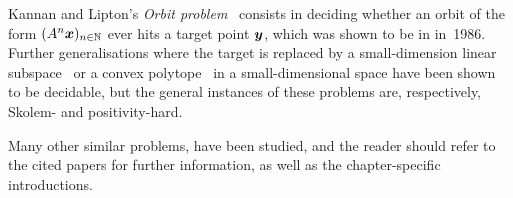 Kannan and Lipton's \emph{Orbit problem}~\cite{KL86} consists in deciding whether an orbit of the form $(A^{n} \boldsymbol{x})_{n \in \mathbb{N}}$ ever hits a target point $\boldsymbol{y}$, which was shown to be in \PTIME{} in~1986. Further generalisations where the target is replaced by a small-dimension linear subspace~\cite{COW13} or a convex polytope~\cite{COW15:SODA} in a small-dimensional space have been shown to be decidable, but the general instances of these problems are, respectively, Skolem- and positivity-hard.

Many other similar problems, have been studied, and the reader should refer to the cited papers for further information, as well as the chapter-specific introductions.
